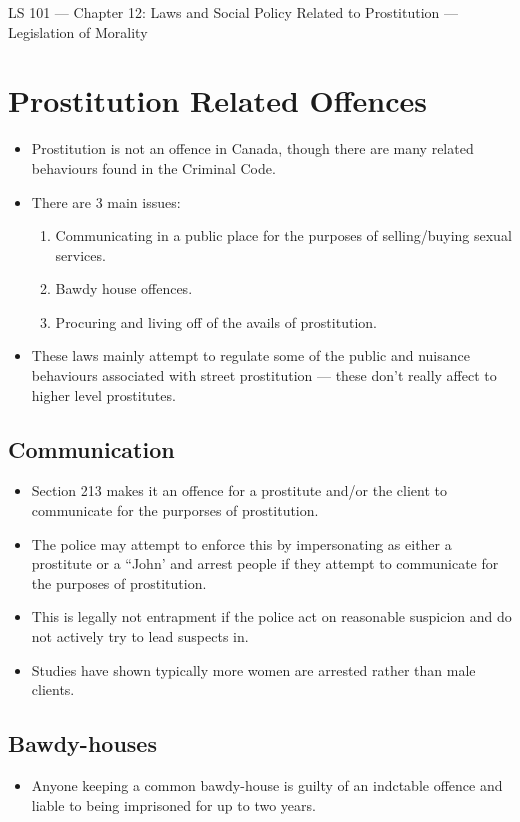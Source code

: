 \documentclass{article}
\author{Clement Tsang}
\begin{document}
\begin{center}
    \Large{LS 101 --- Chapter 12: Laws and Social Policy Related to Prostitution --- Legislation of Morality}
\end{center}

\section{Prostitution Related Offences}
\begin{itemize}
    \item Prostitution is not an offence in Canada, though there are many related behaviours found in the Criminal Code.
    \item There are 3 main issues:
        \begin{enumerate}
            \item Communicating in a public place for the purposes of selling/buying sexual services.
            \item Bawdy house offences.
            \item Procuring and living off of the avails of prostitution.
        \end{enumerate}
    \item These laws mainly attempt to regulate some of the public and nuisance behaviours associated with street prostitution --- these don't really affect to higher level prostitutes.
\end{itemize}

\subsection{Communication}
\begin{itemize}
    \item Section 213 makes it an offence for a prostitute and/or the client to communicate for the purporses of prostitution.
    \item The police may attempt to enforce this by impersonating as either a prostitute or a ``John' and arrest people if they attempt to communicate for the purposes of prostitution.
    \item This is legally not entrapment if the police act on reasonable suspicion and do not actively try to lead suspects in.
    \item Studies have shown typically more women are arrested rather than male clients. 
\end{itemize}

\subsection{Bawdy-houses}
\begin{itemize}
    \item Anyone keeping a common bawdy-house is guilty of an indctable offence and liable to being imprisoned for up to two years.
\end{itemize}
\end{document}
